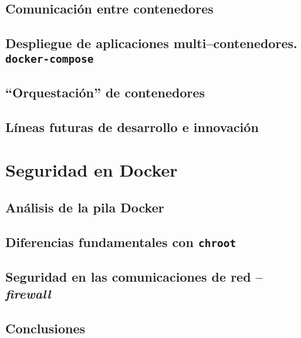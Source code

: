 \documentclass[a4paper,oneside,12pt]{article}
\begin{document}
\subsection{Comunicación entre contenedores}

\subsection{Despliegue de aplicaciones multi--contenedores. \texttt{docker-compose}}\label{sec:compose}

\subsection{``Orquestación'' de contenedores}\label{sec:swarm}

\subsection{Líneas futuras de desarrollo e innovación}


\section{Seguridad en Docker}\label{sec:security}

\subsection{Análisis de la pila Docker}

\subsection{Diferencias fundamentales con \texttt{chroot}}

\subsection{Seguridad en las comunicaciones de red -- \textit{firewall}}

\subsection{Conclusiones}


\newpage
\printbibliography[heading=bibintoc]

\appendix
\end{document}
